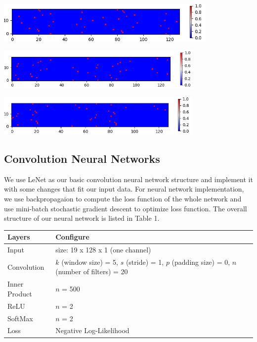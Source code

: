 \documentclass[letterpaper, 11pt]{article}
\newenvironment{Figure}
  {\par\medskip\noindent\minipage{\linewidth}}
  {\endminipage\par\medskip}
\begin{document}
\begin{multicols*}{2}
{\begin{Figure}
\end{Figure} 
\begin{Figure}
\includegraphics[height=2cm, width=\textwidth]{neg1.png}
\end{Figure} 
\begin{Figure}
\includegraphics[height=2cm, width=\textwidth]{neg2.png}
\end{Figure} 
\begin{Figure}
\includegraphics[height=2cm, width=\textwidth]{neg3.png}
\end{Figure} 
\subsection{Convolution Neural Networks}
We use LeNet as our basic convolution neural network structure and implement it with some changes that fit our input data. For neural network implementation, we use backpropagaion to compute the loss function of the whole network and use mini-batch stochastic gradient descent to optimize loss function. The overall structure of our neural network is listed in Table 1.
\begin{center}
\begin{tabular}{ || m{2cm} | m{5cm} ||}
\hline
\textbf{Layers} & \textbf{Configure} \\ 
\hline
Input & size: 19 x 128 x 1 (one channel) \\
\hline
Convolution & $k$ (window size) = 5, $s$ (stride) = 1, $p$ (padding size) = 0, $n$ (number of filters) = 20 \\
\hline
Inner Product & $n$ = 500 \\
\hline
ReLU & $n$ = 2\\
\hline
SoftMax  &  $n$ = 2\\
\hline 
Loss & Negative Log-Likelihood\\
\hline
\end{tabular}
\vspace{2mm}


\end{center}}
\end{multicols*}
\end{document}
